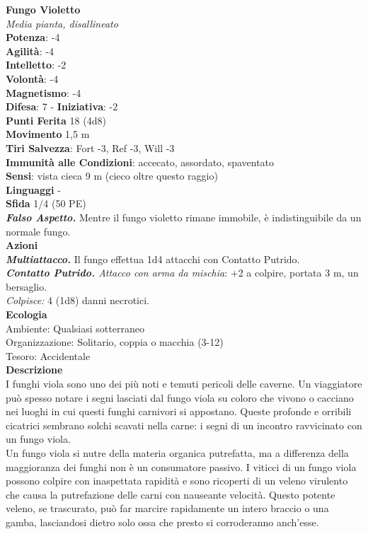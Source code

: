 \begin{multicols}{2}
\medskip\textbf{Fungo Violetto}\\
\emph{Media pianta, disallineato}\\
\textbf{Potenza}: -4\\
\textbf{Agilità}: -4\\
\textbf{Intelletto}: -2\\
\textbf{Volontà}: -4\\
\textbf{Magnetismo}: -4\\
\textbf{Difesa}: 7 - \textbf{Iniziativa}: -2\\
\textbf{Punti Ferita} 18 (4d8)\\
\textbf{Movimento} 1,5 m\\
\textbf{Tiri Salvezza}: Fort -3, Ref -3, Will -3\\
\textbf{Immunità alle Condizioni}: accecato, assordato, spaventato\\
\textbf{Sensi}: vista cieca 9 m (cieco oltre questo raggio)\\
\textbf{Linguaggi} -\\
\textbf{Sfida} 1/4 (50 PE)\smallskip\\
\emph{\textbf{Falso Aspetto.}} Mentre il fungo violetto rimane immobile, è indistinguibile da un normale fungo.\\
\smallskip\textbf{Azioni}\\
\emph{\textbf{Multiattacco.}} Il fungo effettua 1d4 attacchi con Contatto Putrido.\\
\emph{\textbf{Contatto Putrido.} Attacco con arma da mischia}: +2 a colpire, portata 3 m, un bersaglio.\\
\emph{Colpisce:} 4 (1d8) danni necrotici.\\
\textbf{Ecologia}\\
Ambiente: Qualsiasi sotterraneo\\
Organizzazione: Solitario, coppia o macchia (3-12)\\
Tesoro: Accidentale\\
\textbf{Descrizione}\\
I funghi viola sono uno dei più noti e temuti pericoli delle caverne. Un viaggiatore può spesso notare i segni lasciati dal fungo viola su coloro che vivono o cacciano nei luoghi in cui questi funghi carnivori si appostano. Queste profonde e orribili cicatrici sembrano solchi scavati nella carne: i segni di un incontro ravvicinato con un fungo viola.\\
Un fungo viola si nutre della materia organica putrefatta, ma a differenza della maggioranza dei funghi non è un consumatore passivo. I viticci di un fungo viola possono colpire con inaspettata rapidità e sono ricoperti di un veleno virulento che causa la putrefazione delle carni con nauseante velocità. Questo potente veleno, se trascurato, può far marcire rapidamente un intero braccio o una gamba, lasciandosi dietro solo ossa che presto si corroderanno anch’esse.\\

\end{multicols}
